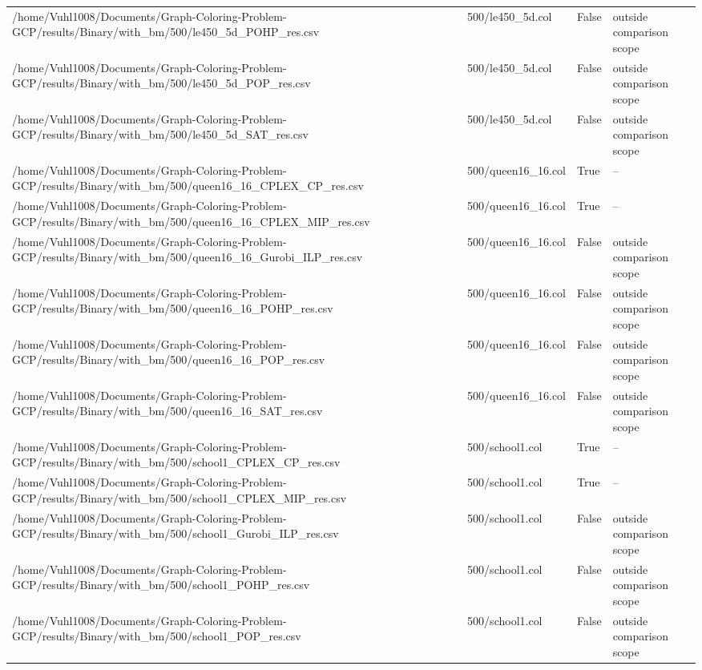 \begin{table}[htbp]
\begin{tabular}{llll}
/home/Vuhl1008/Documents/Graph-Coloring-Problem-GCP/results/Binary/with\_bm/500/le450\_5d\_POHP\_res.csv & 500/le450\_5d.col & False & outside comparison scope \\
/home/Vuhl1008/Documents/Graph-Coloring-Problem-GCP/results/Binary/with\_bm/500/le450\_5d\_POP\_res.csv & 500/le450\_5d.col & False & outside comparison scope \\
/home/Vuhl1008/Documents/Graph-Coloring-Problem-GCP/results/Binary/with\_bm/500/le450\_5d\_SAT\_res.csv & 500/le450\_5d.col & False & outside comparison scope \\
/home/Vuhl1008/Documents/Graph-Coloring-Problem-GCP/results/Binary/with\_bm/500/queen16\_16\_CPLEX\_CP\_res.csv & 500/queen16\_16.col & True & -- \\
/home/Vuhl1008/Documents/Graph-Coloring-Problem-GCP/results/Binary/with\_bm/500/queen16\_16\_CPLEX\_MIP\_res.csv & 500/queen16\_16.col & True & -- \\
/home/Vuhl1008/Documents/Graph-Coloring-Problem-GCP/results/Binary/with\_bm/500/queen16\_16\_Gurobi\_ILP\_res.csv & 500/queen16\_16.col & False & outside comparison scope \\
/home/Vuhl1008/Documents/Graph-Coloring-Problem-GCP/results/Binary/with\_bm/500/queen16\_16\_POHP\_res.csv & 500/queen16\_16.col & False & outside comparison scope \\
/home/Vuhl1008/Documents/Graph-Coloring-Problem-GCP/results/Binary/with\_bm/500/queen16\_16\_POP\_res.csv & 500/queen16\_16.col & False & outside comparison scope \\
/home/Vuhl1008/Documents/Graph-Coloring-Problem-GCP/results/Binary/with\_bm/500/queen16\_16\_SAT\_res.csv & 500/queen16\_16.col & False & outside comparison scope \\
/home/Vuhl1008/Documents/Graph-Coloring-Problem-GCP/results/Binary/with\_bm/500/school1\_CPLEX\_CP\_res.csv & 500/school1.col & True & -- \\
/home/Vuhl1008/Documents/Graph-Coloring-Problem-GCP/results/Binary/with\_bm/500/school1\_CPLEX\_MIP\_res.csv & 500/school1.col & True & -- \\
/home/Vuhl1008/Documents/Graph-Coloring-Problem-GCP/results/Binary/with\_bm/500/school1\_Gurobi\_ILP\_res.csv & 500/school1.col & False & outside comparison scope \\
/home/Vuhl1008/Documents/Graph-Coloring-Problem-GCP/results/Binary/with\_bm/500/school1\_POHP\_res.csv & 500/school1.col & False & outside comparison scope \\
/home/Vuhl1008/Documents/Graph-Coloring-Problem-GCP/results/Binary/with\_bm/500/school1\_POP\_res.csv & 500/school1.col & False & outside comparison scope \\

\end{tabular}
\end{table}
